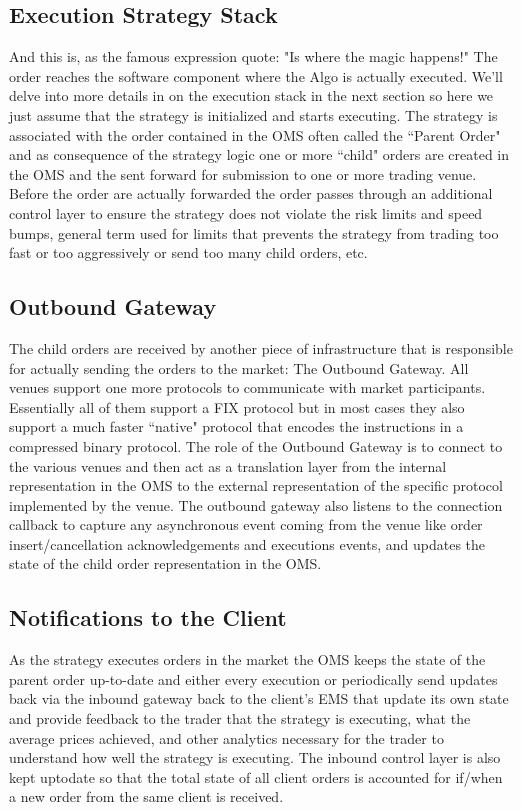\subsection{Execution Strategy Stack}
And this is, as the famous expression quote: "Is where the magic happens!" The order reaches the software component where the Algo is actually executed. We'll delve into more details in on the execution stack in the next section so here we just assume that the strategy is initialized and starts executing. The strategy is associated with the order contained in the OMS often called the ``Parent Order" and as consequence of the strategy logic one or more ``child" orders  are created in the OMS and the sent forward for submission to one or more trading venue. Before the order are actually forwarded the order passes through an additional control layer to ensure the strategy does not violate the risk limits and speed bumps, general term used for limits that prevents the strategy from trading too fast or too aggressively or send too many child orders, etc.

\subsection{Outbound Gateway}
The child orders are received by another piece of infrastructure that is responsible for actually sending the orders to the market: The Outbound Gateway. All venues support one more protocols to communicate with market participants. Essentially all of them support a FIX protocol but in most cases they also support a much faster ``native" protocol that encodes the instructions in a compressed binary protocol. The role of the Outbound Gateway is to connect to the various venues and then act as a translation layer from the internal representation in the OMS to the external representation of the specific protocol implemented by the venue. The outbound gateway also listens to the connection callback to capture any asynchronous event coming from the venue like order insert/cancellation acknowledgements and executions events, and updates the state of the child order representation in the OMS.

\subsection{Notifications to the Client}
As the strategy executes orders in the market the OMS keeps the state of the parent order up-to-date and either every execution or periodically send updates back via the inbound gateway back to the client's EMS that update its own state and provide feedback to the trader that the strategy is executing,  what the average prices achieved, and other analytics necessary for the trader to understand how well the strategy is executing. The inbound control layer is also kept uptodate so that the total state of all client orders is accounted for if/when a new order from the same client is received.\\

